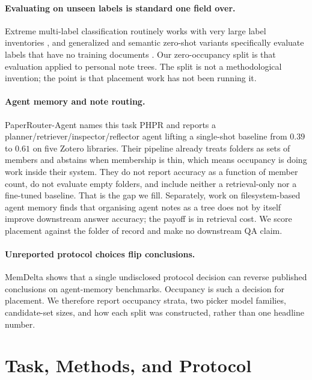 \documentclass[11pt]{article}
\begin{document}
\paragraph{Evaluating on unseen labels is standard one field over.}
Extreme multi-label classification routinely works with very large label inventories \citep{you2019attentionxml}, and generalized and semantic zero-shot variants specifically evaluate labels that have no training documents \citep{gupta2021zestxml,aggarwal2023semsup}.
Our zero-occupancy split is that evaluation applied to personal note trees.
The split is not a methodological invention; the point is that placement work has not been running it.

\paragraph{Agent memory and note routing.}
PaperRouter-Agent \citep{paperrouter} names this task PHPR and reports a planner/retriever/inspector/reflector agent lifting a single-shot baseline from $0.39$ to $0.61$ on five Zotero libraries.
Their pipeline already treats folders as sets of members and abstains when membership is thin, which means occupancy is doing work inside their system.
They do not report accuracy as a function of member count, do not evaluate empty folders, and include neither a retrieval-only nor a fine-tuned baseline.
That is the gap we fill.
Separately, work on filesystem-based agent memory \citep{filesystem-memory} finds that organising agent notes as a tree does not by itself improve downstream answer accuracy; the payoff is in retrieval cost.
We score placement against the folder of record and make no downstream QA claim.

\paragraph{Unreported protocol choices flip conclusions.}
MemDelta \citep{memdelta} shows that a single undisclosed protocol decision can reverse published conclusions on agent-memory benchmarks.
Occupancy is such a decision for placement.
We therefore report occupancy strata, two picker model families, candidate-set sizes, and how each split was constructed, rather than one headline number.

\section{Task, Methods, and Protocol}
\label{sec:method}
\end{document}
